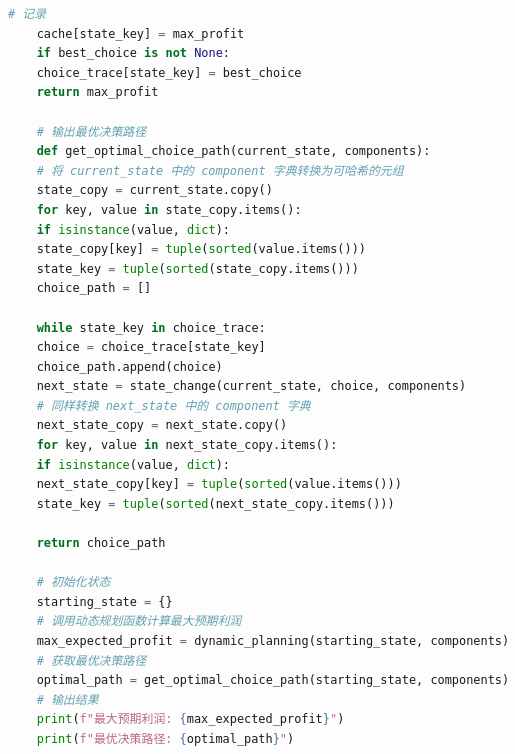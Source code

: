 \documentclass{article}
\begin{document}
\begin{lstlisting}[language=Python, caption={问题3求解过程}]
	# 记录
	cache[state_key] = max_profit
	if best_choice is not None:
	choice_trace[state_key] = best_choice
	return max_profit
	
	# 输出最优决策路径
	def get_optimal_choice_path(current_state, components):
	# 将 current_state 中的 component 字典转换为可哈希的元组
	state_copy = current_state.copy()
	for key, value in state_copy.items():
	if isinstance(value, dict):
	state_copy[key] = tuple(sorted(value.items()))
	state_key = tuple(sorted(state_copy.items()))
	choice_path = []
	
	while state_key in choice_trace:
	choice = choice_trace[state_key]
	choice_path.append(choice)
	next_state = state_change(current_state, choice, components)
	# 同样转换 next_state 中的 component 字典
	next_state_copy = next_state.copy()
	for key, value in next_state_copy.items():
	if isinstance(value, dict):
	next_state_copy[key] = tuple(sorted(value.items()))
	state_key = tuple(sorted(next_state_copy.items()))
	
	return choice_path
	
	# 初始化状态
	starting_state = {}
	# 调用动态规划函数计算最大预期利润
	max_expected_profit = dynamic_planning(starting_state, components)
	# 获取最优决策路径
	optimal_path = get_optimal_choice_path(starting_state, components)
	# 输出结果
	print(f"最大预期利润: {max_expected_profit}")
	print(f"最优决策路径: {optimal_path}")
	\end{lstlisting}
\end{document}
